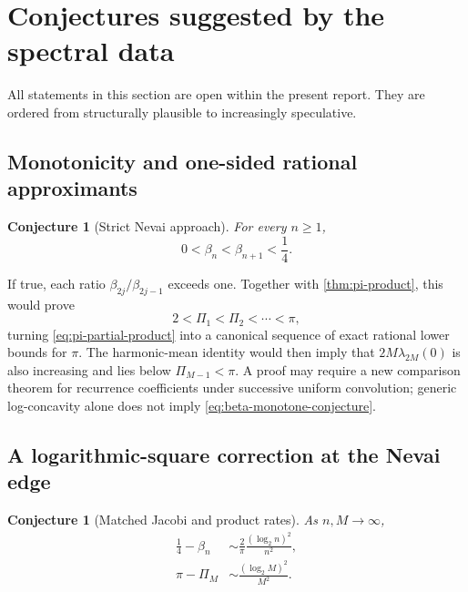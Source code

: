 \documentclass[11pt,oneside]{article}
\newtheorem{conjecture}[theorem]{Conjecture}
\theoremstyle{definition}
\theoremstyle{remark}
\numberwithin{equation}{section}
\begin{document}
\section{Conjectures suggested by the spectral data}
\label{sec:conjectures}

All statements in this section are open within the present report.  They are
ordered from structurally plausible to increasingly speculative.

\subsection{Monotonicity and one-sided rational approximants}

\begin{conjecture}[Strict Nevai approach]
\label{conj:beta-monotone}
For every $n\ge1$,
\begin{equation}
 0<\beta_n<\beta_{n+1}<\frac14.
 \label{eq:beta-monotone-conjecture}
\end{equation}
\end{conjecture}

If true, each ratio $\beta_{2j}/\beta_{2j-1}$ exceeds one.  Together with
\cref{thm:pi-product}, this would prove
\begin{equation}
 2<\Pi_1<\Pi_2<\cdots<\pi,
 \label{eq:pi-lower-bounds-conjectural}
\end{equation}
turning \cref{eq:pi-partial-product} into a canonical sequence of exact
rational lower bounds for $\pi$.  The harmonic-mean identity would then imply
that $2M\lambda_{2M}(0)$ is also increasing and lies below $\Pi_{M-1}<\pi$.
A proof may require a new comparison theorem for recurrence coefficients under
successive uniform convolution; generic log-concavity alone does not imply
\cref{eq:beta-monotone-conjecture}.

\subsection{A logarithmic-square correction at the Nevai edge}

\begin{conjecture}[Matched Jacobi and product rates]
\label{conj:beta-rate}
As $n,M\to\infty$,
\begin{align}
 \frac14-\beta_n
 &\sim\frac{2}{\pi}\frac{(\log_2n)^2}{n^2},
 \label{eq:beta-rate-conjecture}\\
 \pi-\Pi_M
 &\sim\frac{(\log_2M)^2}{M^2}.
 \label{eq:product-rate-conjecture}
\end{align}
\end{conjecture}
\end{document}
